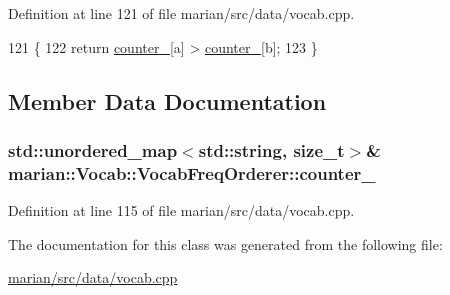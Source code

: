 Definition at line 121 of file marian/src/data/vocab.\+cpp.


\begin{DoxyCode}
121                                                                 \{
122     \textcolor{keywordflow}{return} \hyperlink{classmarian_1_1Vocab_1_1VocabFreqOrderer_a1da97bc718acb34e0fe6e5c40a93291a}{counter\_}[a] > \hyperlink{classmarian_1_1Vocab_1_1VocabFreqOrderer_a1da97bc718acb34e0fe6e5c40a93291a}{counter\_}[b];
123   \}
\end{DoxyCode}


\subsection{Member Data Documentation}
\subsubsection[{\texorpdfstring{counter\+\_\+}{counter_}}]{\setlength{\rightskip}{0pt plus 5cm}std\+::unordered\+\_\+map$<$std\+::string, size\+\_\+t$>$\& marian\+::\+Vocab\+::\+Vocab\+Freq\+Orderer\+::counter\+\_\+\hspace{0.3cm}{\ttfamily [private]}}\hypertarget{classmarian_1_1Vocab_1_1VocabFreqOrderer_a1da97bc718acb34e0fe6e5c40a93291a}{}\label{classmarian_1_1Vocab_1_1VocabFreqOrderer_a1da97bc718acb34e0fe6e5c40a93291a}


Definition at line 115 of file marian/src/data/vocab.\+cpp.



The documentation for this class was generated from the following file\+:\begin{DoxyCompactItemize}
\item 
\hyperlink{marian_2src_2data_2vocab_8cpp}{marian/src/data/vocab.\+cpp}\end{DoxyCompactItemize}
